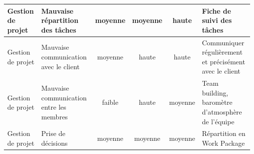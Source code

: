 \begin{center}
{\begin{tabular}{|>{\raggedright\arraybackslash}p{3cm}|>{\raggedright\arraybackslash}p{3.5cm}|c|c|c|>{\raggedright\arraybackslash}p{4cm}|}
      Gestion de projet & Mauvaise répartition des tâches & moyenne & moyenne & haute & Fiche de suivi des tâches \\
      \hline
      Gestion de projet & Mauvaise communication avec le client & moyenne & haute & haute & Communiquer régulièrement et précisément avec le client \\
      \hline
      Gestion de projet & Mauvaise communication entre les membres & faible & haute & moyenne & Team building, baromètre d'atmosphère de l'équipe \\
      \hline
      Gestion de projet & Prise de décisions & moyenne & moyenne & moyenne & Répartition en Work Package \\
      \hline
      \end{tabular}
   }
\end{center}